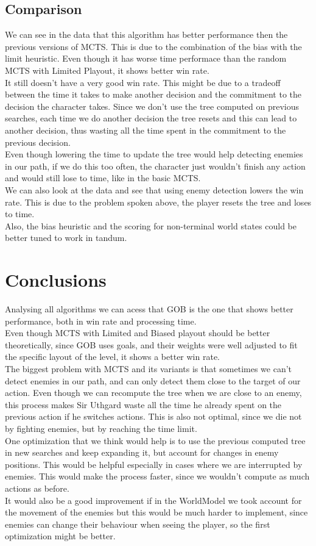 \documentclass{article}
\begin{document}
  \subsection{Comparison}
  We can see in the data that this algorithm has better performance then the previous versions of MCTS. This is due to the combination of the bias with the limit heuristic.
  Even though it has worse time performace than the random MCTS with Limited Playout, it shows better win rate. \\
  It still doesn't have a very good win rate. This might be due to a tradeoff between the time it takes to make another decision and the commitment to the decision the
  character takes. Since we don't use the tree computed on previous searches, each time we do another decision the tree resets and this can lead to another decision,
  thus wasting all the time spent in the commitment to the previous decision.\\ 
  Even though lowering the time to update the tree would help detecting enemies in our path, if we do this too often, the character just wouldn't finish any action 
  and would still lose to time, like in the basic MCTS.\\
  We can also look at the data and see that using enemy detection lowers the win rate. This is due to the problem spoken above, the player resets the tree and loses
  to time.\\ 
  Also, the bias heuristic and the scoring for non-terminal world states could be better tuned to work in tandum. \\

  \section{Conclusions}
  Analysing all algorithms we can acess that GOB is the one that shows better performance, both in win rate and processing time.\\
  Even though MCTS with Limited and Biased playout should be better theoretically, since GOB uses goals, and their weights were well adjusted to fit the 
  specific layout of the level, it shows a better win rate.\\
  The biggest problem with MCTS and its variants is that sometimes we can't detect enemies in our path, and can only detect them close to the target of our action.
  Even though we can recompute the tree when we are close to an enemy, this process makes Sir Uthgard waste all the time he already spent on the previous action if he switches
  actions. This is also not optimal, since we die not by fighting enemies, but by reaching the time limit.\\
  One optimization that we think would help is to use the previous computed tree in new searches and keep expanding it, but account for changes in enemy positions. This would be 
  helpful especially in cases where we are interrupted by enemies. 
  This would make the process faster, since we wouldn't compute as much actions as before.\\
  It would also be a good improvement if in the WorldModel we took account for the movement of the enemies but this would be much harder to implement, since enemies can
  change their behaviour when seeing the player, so the first optimization might be better.
\end{document}
